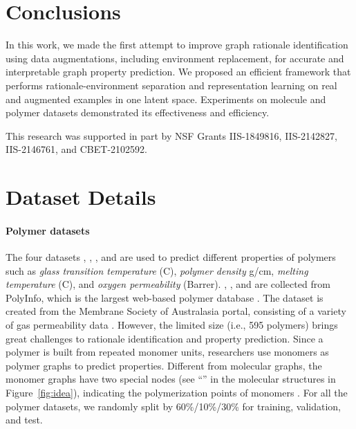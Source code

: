 \documentclass[sigconf]{acmart}
\begin{document}
\section{Conclusions}
\label{sec:conclusion}
In this work, we made the first attempt to improve graph rationale identification using data augmentations, including environment replacement, for accurate and interpretable graph property prediction. We proposed an efficient framework that performs rationale-environment separation and representation learning on real and augmented examples in one latent space. Experiments on molecule and polymer datasets demonstrated its effectiveness and efficiency.
 
\begin{acks}
This research was supported in part by NSF Grants IIS-1849816, IIS-2142827, IIS-2146761, and CBET-2102592.
\end{acks}

\balance



\clearpage
\appendix
\section{Dataset Details}
\label{sec:dataset_details}
\vspace{-0.05in}
\paragraph{Polymer datasets} The four datasets \glassTemp, \meltTemp, \density, and \oxygen are used to predict different properties of polymers such as \emph{glass transition temperature} (C), \emph{polymer density} g/cm, \emph{melting temperature} (C), and \emph{oxygen permeability} (Barrer). \glassTemp, \meltTemp, and \density are collected from PolyInfo, which is the largest web-based polymer database \cite{otsuka2011polyinfo}. The \oxygen dataset is created from the Membrane Society of Australasia portal,
consisting of a variety of gas permeability data \cite{thornton2012polymer}. However, the limited size (i.e., 595 polymers) brings great challenges to rationale identification and property prediction. Since a polymer is built from repeated monomer units, researchers use monomers as polymer graphs to predict properties. Different from molecular graphs, the monomer graphs have two special nodes (see ``'' in the molecular structures in Figure~\ref{fig:idea}), indicating the polymerization points of monomers \cite{ma2020pi1m}. For all the polymer datasets, we randomly split by 60\%/10\%/30\% for training, validation, and test.
\end{document}
